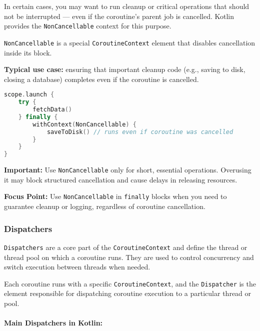 \documentclass[a4paper,12pt]{article}
\begin{document}
In certain cases, you may want to run cleanup or critical operations that should not be interrupted — even if the coroutine’s parent job is cancelled. Kotlin provides the \texttt{NonCancellable} context for this purpose.

\texttt{NonCancellable} is a special \texttt{CoroutineContext} element that disables cancellation inside its block.

\textbf{Typical use case:} ensuring that important cleanup code (e.g., saving to disk, closing a database) completes even if the coroutine is cancelled.

\begin{lstlisting}[language=Kotlin]
scope.launch {
    try {
        fetchData()
    } finally {
        withContext(NonCancellable) {
            saveToDisk() // runs even if coroutine was cancelled
        }
    }
}
\end{lstlisting}

\textbf{Important:} Use \texttt{NonCancellable} only for short, essential operations. Overusing it may block structured cancellation and cause delays in releasing resources.

\textbf{Focus Point:} Use \texttt{NonCancellable} in \texttt{finally} blocks when you need to guarantee cleanup or logging, regardless of coroutine cancellation.


\subsubsection{Dispatchers}

\texttt{Dispatchers} are a core part of the \texttt{CoroutineContext} and define the thread or thread pool on which a coroutine runs. They are used to control concurrency and switch execution between threads when needed.

Each coroutine runs with a specific \texttt{CoroutineContext}, and the \texttt{Dispatcher} is the element responsible for dispatching coroutine execution to a particular thread or pool.

\paragraph{Main Dispatchers in Kotlin:}
\end{document}
